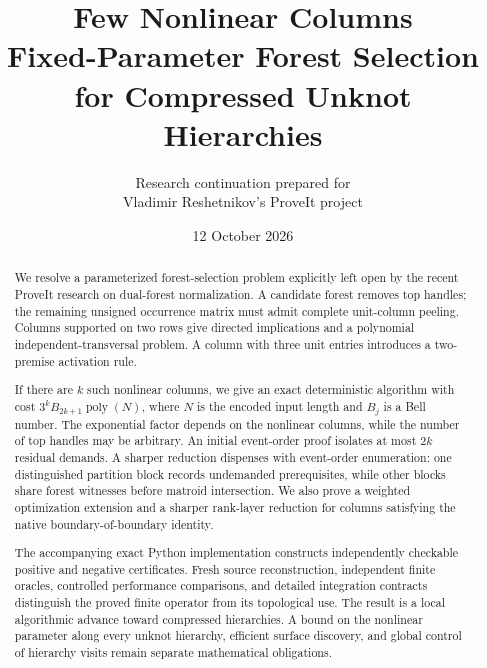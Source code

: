 \documentclass[11pt,a4paper]{article}
\title{\color{Accent}\textbf{Few Nonlinear Columns}\\[5pt]
\Large Fixed-Parameter Forest Selection\\for Compressed Unknot Hierarchies}
\author{Research continuation prepared for\\Vladimir Reshetnikov's ProveIt project}
\date{12 October 2026}
\theoremstyle{definition}
\begin{document}
\maketitle
\begin{abstract}
We resolve a parameterized forest-selection problem explicitly left open by
the recent ProveIt research on dual-forest normalization. A candidate forest
removes top handles; the remaining unsigned occurrence matrix must admit
complete unit-column peeling. Columns supported on two rows give directed
implications and a polynomial independent-transversal problem. A column
with three unit entries introduces a two-premise activation rule.

If there are $k$ such nonlinear columns, we give an exact deterministic
algorithm with cost $3^k B_{2k+1}\operatorname{poly}(N)$, where $N$ is the
encoded input length and $B_j$ is a Bell number. The exponential factor
depends on the nonlinear columns, while the number of top handles may be
arbitrary. An initial event-order proof isolates at most $2k$ residual demands.
A sharper reduction dispenses with event-order enumeration: one
distinguished partition block records undemanded prerequisites, while
other blocks share forest witnesses before matroid intersection. We also prove a weighted
optimization extension and a sharper rank-layer reduction for columns
satisfying the native boundary-of-boundary identity.

The accompanying exact Python implementation constructs independently
checkable positive and negative certificates. Fresh source reconstruction,
independent finite oracles, controlled performance comparisons, and detailed
integration contracts distinguish the proved finite operator from its
topological use. The result is a local algorithmic advance toward compressed
hierarchies. A bound on the nonlinear parameter along every unknot hierarchy,
efficient surface discovery, and global control of hierarchy visits remain
separate mathematical obligations.
\end{abstract}
\clearpage
\tableofcontents
\newpage










\end{document}
